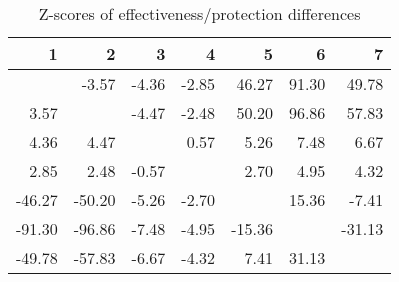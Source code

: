 \begin{table}[ht]
\centering
\begin{tabular}{rrrrrrr}
  \hline
1 & 2 & 3 & 4 & 5 & 6 & 7 \\ 
  \hline
 & -3.57 & -4.36 & -2.85 & 46.27 & 91.30 & 49.78 \\ 
  3.57 &  & -4.47 & -2.48 & 50.20 & 96.86 & 57.83 \\ 
  4.36 & 4.47 &  & 0.57 & 5.26 & 7.48 & 6.67 \\ 
  2.85 & 2.48 & -0.57 &  & 2.70 & 4.95 & 4.32 \\ 
  -46.27 & -50.20 & -5.26 & -2.70 &  & 15.36 & -7.41 \\ 
  -91.30 & -96.86 & -7.48 & -4.95 & -15.36 &  & -31.13 \\ 
  -49.78 & -57.83 & -6.67 & -4.32 & 7.41 & 31.13 &  \\ 
   \hline
\end{tabular}
\caption{Z-scores of effectiveness/protection differences} 
\end{table}
